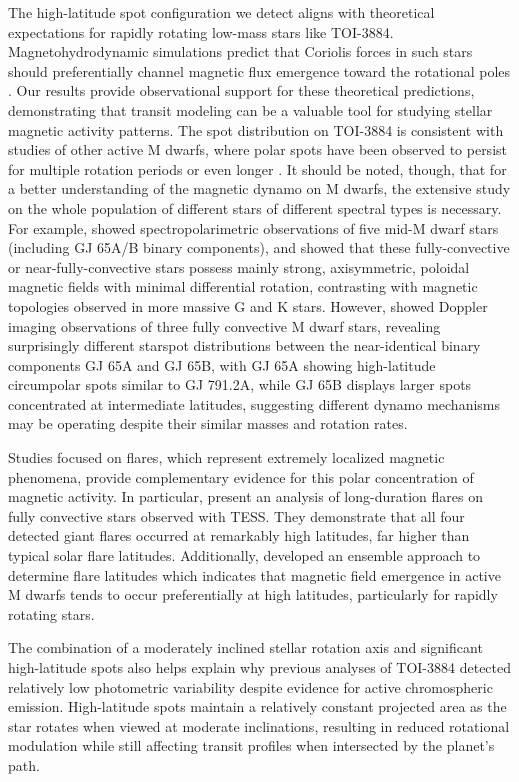\documentclass[twocolumn]{aastex631}
\begin{document}
The high-latitude spot configuration we detect aligns with theoretical expectations for rapidly rotating low-mass stars like 
TOI-3884. Magnetohydrodynamic simulations predict that Coriolis forces in such stars should preferentially channel 
magnetic flux emergence toward the rotational poles \citep{Yadav2015,Almenara2022}. Our results provide observational support for these theoretical predictions, 
demonstrating that transit modeling can be a valuable tool for studying stellar magnetic activity patterns.
The spot distribution on TOI-3884 is consistent with studies of other active M dwarfs, where polar spots have been observed 
to persist for multiple rotation periods or even longer \citep{Barnes2017,Morin2008,Strassmeier2009}. It should be noted, though,
that for a better understanding of the magnetic dynamo on M dwarfs, the extensive study on the whole population of different
stars of different spectral types is necessary. 
For example, \cite{Morin2008} showed spectropolarimetric observations of five mid-M dwarf stars 
(including GJ 65A/B binary components), and showed that these fully-convective or near-fully-convective stars possess 
mainly strong, axisymmetric, poloidal magnetic fields with minimal differential rotation, contrasting with magnetic 
topologies observed in more massive G and K stars. However,
\cite{Barnes2017} showed Doppler imaging observations of three fully convective M dwarf stars, revealing surprisingly 
different starspot distributions between the near-identical binary components GJ 65A and GJ 65B, with GJ 65A showing 
high-latitude circumpolar spots similar to GJ 791.2A, while GJ 65B displays larger spots concentrated at intermediate 
latitudes, suggesting different dynamo mechanisms may be operating despite their similar masses and rotation rates.

Studies focused on flares, which represent extremely 
localized magnetic phenomena, provide complementary evidence for this polar concentration of magnetic activity. In particular,
\cite{Ilin2021} present an analysis of long-duration flares on fully convective stars observed with TESS. 
They demonstrate that all four detected giant flares occurred at remarkably high latitudes, far higher than typical solar 
flare latitudes. Additionally, \cite{Ilin2023} developed an ensemble approach to determine flare latitudes which indicates 
that magnetic field emergence in active M dwarfs tends to occur preferentially at high latitudes, particularly for 
rapidly rotating stars. 

The combination of a moderately inclined stellar rotation axis and significant high-latitude spots also helps explain why 
previous analyses of TOI-3884 detected relatively low photometric variability despite evidence for active chromospheric emission. 
High-latitude spots maintain a relatively constant projected area as the star rotates when viewed at moderate inclinations, 
resulting in reduced rotational modulation while still affecting transit profiles when intersected by the planet's path.
\end{document}
